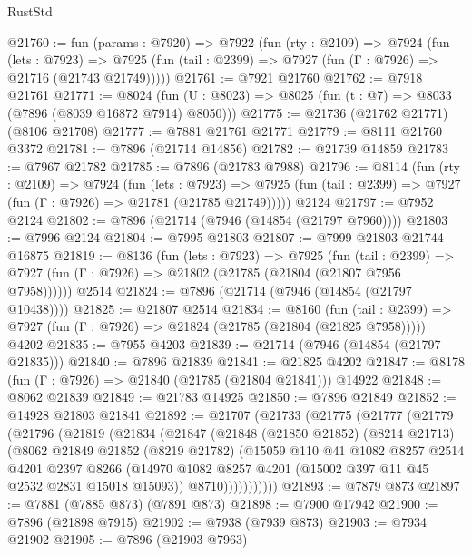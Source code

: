 \begin{lexlean}{RustStd}
\begin{coremodule}
@21760 := fun (params : @7920) =>
  @7922
    (fun (rty : @2109) =>
    @7924
      (fun (lets : @7923) =>
      @7925 (fun (tail : @2399) => @7927 (fun (Γ : @7926) => @21716 (@21743 @21749)))))
@21761 := @7921 @21760
@21762 := @7918 @21761
@21771 := @8024
    (fun (U : @8023) => @8025 (fun (t : @7) => @8033 (@7896 (@8039 @16872 @7914) @8050)))
@21775 := @21736 (@21762 @21771) (@8106 @21708)
@21777 := @7881 @21761 @21771
@21779 := @8111 @21760 @3372
@21781 := @7896 (@21714 @14856)
@21782 := @21739 @14859
@21783 := @7967 @21782
@21785 := @7896 (@21783 @7988)
@21796 := @8114
    (fun (rty : @2109) =>
    @7924
      (fun (lets : @7923) =>
      @7925 (fun (tail : @2399) => @7927 (fun (Γ : @7926) => @21781 (@21785 @21749)))))
    @2124
@21797 := @7952 @2124
@21802 := @7896 (@21714 (@7946 (@14854 (@21797 @7960))))
@21803 := @7996 @2124
@21804 := @7995 @21803
@21807 := @7999 @21803 @21744 @16875
@21819 := @8136
    (fun (lets : @7923) =>
    @7925
      (fun (tail : @2399) =>
      @7927 (fun (Γ : @7926) => @21802 (@21785 (@21804 (@21807 @7956 @7958))))))
    @2514
@21824 := @7896 (@21714 (@7946 (@14854 (@21797 @10438))))
@21825 := @21807 @2514
@21834 := @8160
    (fun (tail : @2399) => @7927 (fun (Γ : @7926) => @21824 (@21785 (@21804 (@21825 @7958)))))
    @4202
@21835 := @7955 @4203
@21839 := @21714 (@7946 (@14854 (@21797 @21835)))
@21840 := @7896 @21839
@21841 := @21825 @4202
@21847 := @8178 (fun (Γ : @7926) => @21840 (@21785 (@21804 @21841))) @14922
@21848 := @8062 @21839
@21849 := @21783 @14925
@21850 := @7896 @21849
@21852 := @14928 @21803 @21841
@21892 := @21707
    (@21733
      (@21775
        (@21777
          (@21779
            (@21796
              (@21819
                (@21834
                  (@21847
                    (@21848
                      (@21850 @21852)
                      (@8214 @21713)
                      (@8062
                        @21849
                        @21852
                        (@8219 @21782)
                        (@15059
                          @110
                          @41
                          @1082
                          @8257
                          @2514
                          @4201
                          @2397
                          @8266
                          (@14970 @1082 @8257 @4201 (@15002 @397 @11 @45 @2532 @2831 @15018 @15093))
                          @8710)))))))))))
@21893 := @7879 @873
@21897 := @7881 (@7885 @873) (@7891 @873)
@21898 := @7900 @17942
@21900 := @7896 (@21898 @7915)
@21902 := @7938 (@7939 @873)
@21903 := @7934 @21902
@21905 := @7896 (@21903 @7963)

\end{coremodule}
\end{lexlean}
